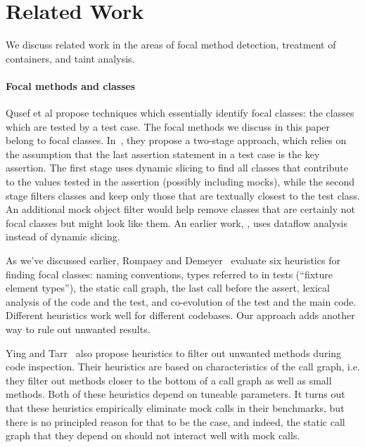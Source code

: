 \section{Related Work}
\label{sec:related}

We discuss related work in the areas of focal method detection,
treatment of containers, and taint analysis.

\paragraph{Focal methods and classes} Qusef et al propose techniques which essentially identify focal classes: the classes which are tested by a test case. The focal methods we discuss in this paper belong to focal classes. In~\cite{DBLP:conf/icsm/QusefBOLB11}, they propose a two-stage approach, which relies on the assumption that the last assertion statement in a test case is the key assertion. The first stage uses dynamic slicing to find all classes that contribute to the values tested in the assertion (possibly including mocks), while the second stage filters classes and keep only those that are textually closest to the test class. An additional mock object filter would help remove classes that are certainly not focal classes but might look like them. An earlier work, \cite{DBLP:conf/icsm/QusefOL10}, uses dataflow analysis instead of dynamic slicing.

As we've discussed earlier, Rompaey and
Demeyer~\cite{rompaey09:_estab_traceab_links_unit_test} evaluate six heuristics for finding focal classes: naming conventions, types referred to in tests (``fixture element types''), the static call graph, the last call before the assert, lexical analysis of the code and the test, and co-evolution of the test and the main code. Different heuristics work well for different codebases. Our approach adds another way to rule out unwanted results.

Ying and Tarr~\cite{DBLP:conf/eclipse/YingT07} also propose heuristics to filter out unwanted methods during code inspection. Their heuristics are based on characteristics of the call graph, i.e. they filter out methods closer to the bottom of a call graph as well as small methods. Both of these heuristics depend on tuneable parameters. It turns out that these heuristics empirically eliminate mock calls in their benchmarks, but there is no principled reason for that to be the case, and indeed, the static call graph that they depend on should not interact well with mock calls.

